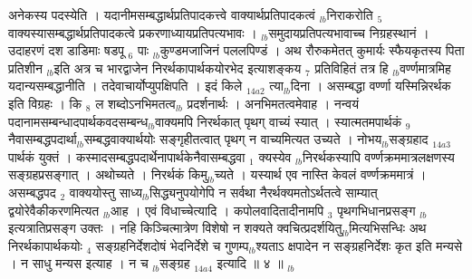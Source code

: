 \documentclass[article,12pt,a4paper]{memoir}%
\newcounter{parCount}
\begin{document}
	  
	  \pstart \leavevmode%
	\hphantom{.}{\color{DodgerBlue3}अनेकस्य पदस्येति} । यदानीमसम्बद्धार्थप्रतिपादकत्त्वे वाक्यार्थप्रतिपादकत्वं {\tiny $_{lb}$}निराकरोति {\tiny $_{5}$} वाक्यस्यासम्बद्धार्थप्रतिपादकत्वे प्रकरणाध्यायप्रतिपत्यभावः । {\tiny $_{lb}$}समुदायप्रतिपत्यभावाच्च निग्रहस्थानं । उदाहरणं दश डाडिमाः षडपू {\tiny $_{6}$} पाः {\tiny $_{lb}$}कुण्डमजाजिनं पललपिण्डं । अथ रौरुकमेतत् कुमार्यः स्फैयकृतस्य पिता प्रतिशीन {\tiny $_{lb}$}इति अत्र च {\color{DodgerBlue3}भारद्वाजेन} निरर्थकापार्थकयोरभेद इत्याशङ्कय {\tiny $_{7}$} प्रतिविहितं तत्र हि {\tiny $_{lb}$}वर्ण्णमात्रमिह यदान्यसम्बद्धानीति । तदेवाचार्योप्युपक्षिपति । {\color{DodgerBlue3}इदं किले} {\tiny $_{14a2}$} त्या{\tiny $_{lb}$}दिना । असम्बद्धा वर्ण्णा यस्मिन्निरर्थक इति विग्रहः । कि {\tiny $_{8}$} ल शब्दोऽनभिमतत्व{\tiny $_{lb}$}\leavevmode{} प्रदर्शनार्थः । अनभिमतत्वमेवाह । नन्वयं पदानामसम्बन्धादपार्थकवदसम्बन्ध{\tiny $_{lb}$}वाक्यमपि निरर्थकात् पृथग् वाच्यं स्यात् । स्यात्मतमपार्थकं {\tiny $_{9}$} \leavevmode{} नैवासम्बद्धपदार्था{\tiny $_{lb}$}सम्बद्धवाक्यार्थयोः सङ्गृहीतत्वात् पृथग् न वाच्यमित्यत उच्यते । {\color{DodgerBlue3}नोभय{\tiny $_{lb}$}सङ्ग्रहाद} {\tiny $_{14a3}$} पार्थकं युक्तं । कस्मादसम्बद्धपदार्थेनापार्थकेनैवासम्बद्धवा {\tiny $_{1}$} क्यस्येव {\tiny $_{lb}$}निरर्थकस्यापि वर्ण्णक्रममात्रलक्षणस्य सङ्ग्रहप्रसङ्गात् । अथोच्यते । निरर्थकं किमु{\tiny $_{lb}$}च्यते । यस्यार्थ एव नास्ति केवलं वर्ण्णक्रममात्रं । असम्बद्धपद {\tiny $_{2}$} वाक्ययोस्तु साध्य{\tiny $_{lb}$}सिद्ध्यनुपयोगेपि न सर्वथा नैरर्थक्यमतोऽर्थतत्वे साम्यात् द्वयोरेवैकीकरणमित्यत {\tiny $_{lb}$}आह । एवं विधाच्चेत्यादि । कपोलवादितादीनामपि {\tiny $_{3}$} पृथगभिधानप्रसङ्ग {\tiny $_{lb}$}इत्यत्रातिप्रसङ्ग उक्तः । नहि किञ्चित्मात्रेण विशेषो न शक्यते क्वचित्प्रदर्शयितु{\tiny $_{lb}$}मित्यभिसन्धिः अथ निरर्थकापार्थकयोः {\tiny $_{4}$} सङ्ग्रहनिर्देशदोषं भेदनिर्देशे च गुणम्प{\tiny $_{lb}$}श्यताऽ {\color{DodgerBlue3}क्षपादेन} न सङ्ग्रहनिर्देशः कृत इति मन्यसे । न साधु मन्यस इत्याह । {\color{DodgerBlue3}न च {\tiny $_{lb}$}सङ्ग्रह} {\tiny $_{14a4}$} इत्यादि ॥ ४ ॥ 
	{}
	\pend%
      {\tiny $_{lb}$}
\end{document}
